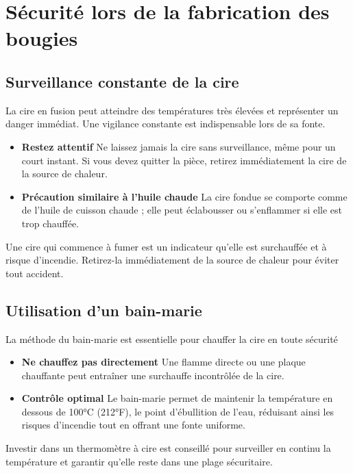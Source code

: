 \documentclass[11pt,fleqn,onecolumn,oneside]{book}
\begin{document}
\section{Sécurité lors de la fabrication des bougies}

\subsection*{Surveillance constante de la cire}

La cire en fusion peut atteindre des températures très élevées et représenter un danger immédiat. Une vigilance constante est indispensable lors de sa fonte. 
\begin{itemize}
    \item \textbf{Restez attentif} Ne laissez jamais la cire sans surveillance, même pour un court instant. Si vous devez quitter la pièce, retirez immédiatement la cire de la source de chaleur.
    \item \textbf{Précaution similaire à l’huile chaude} La cire fondue se comporte comme de l’huile de cuisson chaude ; elle peut éclabousser ou s’enflammer si elle est trop chauffée.
\end{itemize}

\begin{remark}
Une cire qui commence à fumer est un indicateur qu’elle est surchauffée et à risque d’incendie. Retirez-la immédiatement de la source de chaleur pour éviter tout accident.
\end{remark}

\subsection*{Utilisation d’un bain-marie}

La méthode du bain-marie est essentielle pour chauffer la cire en toute sécurité
\begin{itemize}
    \item \textbf{Ne chauffez pas directement} Une flamme directe ou une plaque chauffante peut entraîner une surchauffe incontrôlée de la cire.
    \item \textbf{Contrôle optimal} Le bain-marie permet de maintenir la température en dessous de 100°C (212°F), le point d’ébullition de l’eau, réduisant ainsi les risques d’incendie tout en offrant une fonte uniforme.
\end{itemize}

\begin{remark}
Investir dans un thermomètre à cire est conseillé pour surveiller en continu la température et garantir qu’elle reste dans une plage sécuritaire.
\end{remark}
\end{document}
